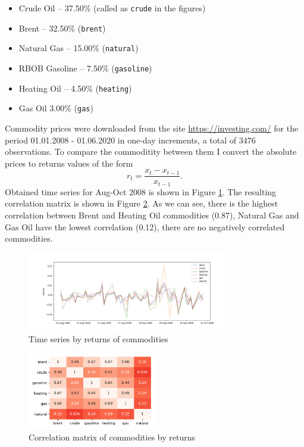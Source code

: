 \documentclass{article}
\begin{document}
\begin{itemize}
    \item Crude Oil -- 37.50\% (called as \texttt{crude} in the figures)
    \item Brent -- 32.50\% (\texttt{brent})
    \item Natural Gas -- 15.00\% (\texttt{natural})
    \item RBOB Gasoline -- 7.50\% (\texttt{gasoline})
    \item Heating Oil -- 4.50\% (\texttt{heating})
    \item Gas Oil 3.00\% (\texttt{gas})
\end{itemize}

Commodity prices were downloaded from the site \url{https://investing.com/} for the period 01.01.2008 - 01.06.2020 in one-day increments, a total of 3476 observations. To compare the commoditity between them I convert the absolute prices to returns values of the form
$$r_t = \frac{x_t - x_{t-1}}{x_{t-1}}.$$
Obtained time series for Aug-Oct 2008 is shown in Figure \ref{fig:returns}. The resulting correlation matrix is shown in Figure \ref{fig:heatmap}. As we can see, there is the highest correlation between Brent and Heating Oil commodities (0.87), Natural Gas and Gas Oil have the lowest correlation (0.12), there are no negatively correlated commodities.

\begin{figure}[h!]
    \centering
    \includegraphics[width=0.8\textwidth]{pics/returns.png}
    \caption{Time series by returns of commodities}
    \label{fig:returns}
\end{figure}

\begin{figure}[h!]
    \centering
    \includegraphics[width=0.5\textwidth]{pics/heatmap.pdf}
    \caption{Correlation matrix of commodities by returns}
    \label{fig:heatmap}
\end{figure}
\end{document}
